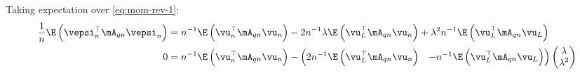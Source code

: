 \documentclass[english,12pt]{book}\usepackage[]{graphicx}\usepackage[]{xcolor}
\begin{document}
Taking expectation over \eqref{eq:mom-rev-1}:
\begin{equation*}
  \begin{aligned}
 \frac{1}{n}\E\left(\vepsi^\top_n\mA_{qn}\vepsi_n\right) & = n^{-1}\E\left(\vu^\top_n\mA_{qn}\vu_n \right) - 2n^{-1}\lambda\E\left(\vu_L^\top\mA_{qn}\vu_n\right) + \lambda^2n^{-1}\E\left(\vu_L^\top\mA_{qn}\vu_L\right) \\
 0 & = n^{-1}\E\left(\vu^\top_n\mA_{qn}\vu_n \right) - \begin{pmatrix}
                                                           2n^{-1}\E\left(\vu_L^\top\mA_{qn}\vu_n\right) &   -n^{-1}\E\left(\vu_L^\top\mA_{qn}\vu_L\right)  
                                                       \end{pmatrix}
                                                       \begin{pmatrix}
                                                        \lambda \\
                                                        \lambda^2
                                                       \end{pmatrix}
 \end{aligned}
\end{equation*}
\end{document}
